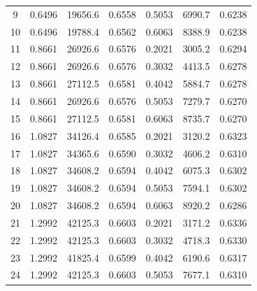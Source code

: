 {\begin{longtable}{|c|c|c|c|c|c|c|}
    9            & 0.6496         & 19656.6         & 0.6558               & 0.5053         & 6990.7          & 0.6238               \\
    10           & 0.6496         & 19788.4         & 0.6562               & 0.6063         & 8388.9          & 0.6238               \\ \hline
    11           & 0.8661         & 26926.6         & 0.6576               & 0.2021         & 3005.2          & 0.6294               \\
    12           & 0.8661         & 26926.6         & 0.6576               & 0.3032         & 4413.5          & 0.6278               \\
    13           & 0.8661         & 27112.5         & 0.6581               & 0.4042         & 5884.7          & 0.6278               \\
    14           & 0.8661         & 26926.6         & 0.6576               & 0.5053         & 7279.7          & 0.6270               \\
    15           & 0.8661         & 27112.5         & 0.6581               & 0.6063         & 8735.7          & 0.6270               \\ \hline
    16           & 1.0827         & 34126.4         & 0.6585               & 0.2021         & 3120.2          & 0.6323               \\
    17           & 1.0827         & 34365.6         & 0.6590               & 0.3032         & 4606.2          & 0.6310               \\
    18           & 1.0827         & 34608.2         & 0.6594               & 0.4042         & 6075.3          & 0.6302               \\
    19           & 1.0827         & 34608.2         & 0.6594               & 0.5053         & 7594.1          & 0.6302               \\
    20           & 1.0827         & 34608.2         & 0.6594               & 0.6063         & 8920.2          & 0.6286               \\ \hline
    21           & 1.2992         & 42125.3         & 0.6603               & 0.2021         & 3171.2          & 0.6336               \\
    22           & 1.2992         & 42125.3         & 0.6603               & 0.3032         & 4718.3          & 0.6330               \\
    23           & 1.2992         & 41825.4         & 0.6599               & 0.4042         & 6190.6          & 0.6317               \\
    24           & 1.2992         & 42125.3         & 0.6603               & 0.5053         & 7677.1          & 0.6310               \\
\end{longtable}
}

